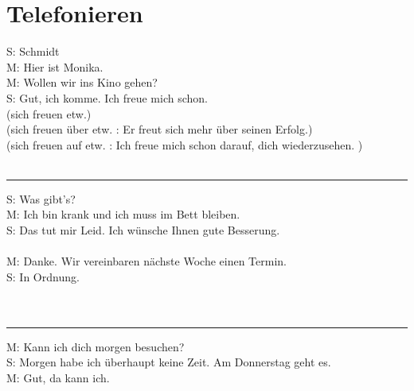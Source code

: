 \section{Telefonieren}
\noindent
S: Schmidt \\
M: Hier ist Monika.  \\
M: Wollen wir ins Kino gehen? \\
S: Gut, ich komme. Ich freue mich schon.  \\
(sich freuen etw.) \\
(sich freuen über etw. \diam[border=true]: Er freut sich mehr über seinen Erfolg.) \\
(sich freuen auf etw. \diam[border=true]: Ich freue mich schon darauf, dich wiederzusehen. ) \\
\\
\rule{\textwidth}{0.05em}
\noindent
S: Was gibt's?  \\
M: Ich bin krank und ich muss im Bett bleiben.  \\
S: Das tut mir Leid. Ich wünsche Ihnen gute Besserung.  \\
\\
\noindent
M: Danke. Wir vereinbaren nächste Woche einen Termin. \\
S: In Ordnung.  \\
\\
\\
\rule{\textwidth}{0.05em}
\noindent
M: Kann ich dich morgen besuchen? \\
S: Morgen habe ich überhaupt keine Zeit. Am Donnerstag geht es. \\
M: Gut, da kann ich.  \\

